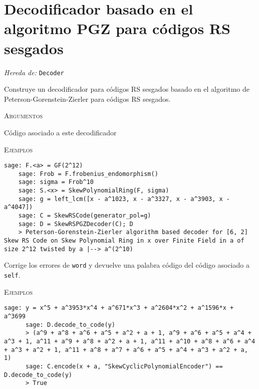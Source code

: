 \section{Decodificador basado en el algoritmo PGZ para códigos RS sesgados}

\begin{description}[leftmargin=1em, font=\normalfont\ttfamily, style=nextline]
  \item[class SkewRSPGZDecoder(self, code)]
  
  \emph{Hereda de:} \texttt{Decoder}

  Construye un decodificador para códigos RS sesgados basado en el algoritmo de Peterson-Gorenstein-Zierler para códigos RS sesgados.

  \textsc{Argumentos}
  \begin{description}[font=\normalfont\ttfamily]
    \item[code] Código asociado a este decodificador
  \end{description}

  \textsc{Ejemplos}
  \begin{lstlisting}[gobble=4]
    sage: F.<a> = GF(2^12)
    sage: Frob = F.frobenius_endomorphism()
    sage: sigma = Frob^10
    sage: S.<x> = SkewPolynomialRing(F, sigma)
    sage: g = left_lcm([x - a^1023, x - a^3327, x - a^3903, x - a^4047])
    sage: C = SkewRSCode(generator_pol=g)
    sage: D = SkewRSPGZDecoder(C); D
    > Peterson-Gorenstein-Zierler algorithm based decoder for [6, 2] Skew RS Code on Skew Polynomial Ring in x over Finite Field in a of size 2^12 twisted by a |--> a^(2^10)
  \end{lstlisting}

  \begin{description}[font=\ttfamily, style=nextline]
    \item[decode\_to\_code(self, word)] Corrige los errores de \texttt{word} y devuelve una palabra código del código asociado a \texttt{self}.
    
    \textsc{Ejemplos}
    \begin{lstlisting}[gobble=6]
      sage: y = x^5 + a^3953*x^4 + a^671*x^3 + a^2604*x^2 + a^1596*x + a^3699
      sage: D.decode_to_code(y)
      > (a^9 + a^8 + a^6 + a^5 + a^2 + a + 1, a^9 + a^6 + a^5 + a^4 + a^3 + 1, a^11 + a^9 + a^8 + a^2 + a + 1, a^11 + a^10 + a^8 + a^6 + a^4 + a^3 + a^2 + 1, a^11 + a^8 + a^7 + a^6 + a^5 + a^4 + a^3 + a^2 + a, 1)
      sage: C.encode(x + a, "SkewCyclicPolynomialEncoder") == D.decode_to_code(y)
      > True
    \end{lstlisting}
  
  \end{description}
\end{description}


